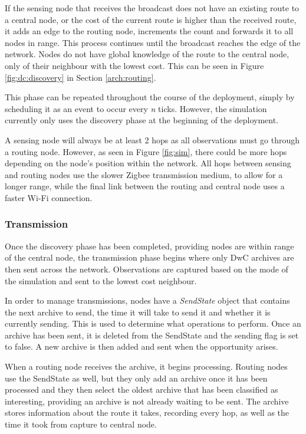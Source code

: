 	If the sensing node that receives the broadcast does not have an existing route to a central node, or the cost of the current route is higher than the received route, it adds an edge to the routing node, increments the count and forwards it to all nodes in range. This process continues until the broadcast reaches the edge of the network. Nodes do not have global knowledge of the route to the central node, only of their neighbour with the lowest cost. This can be seen in Figure \ref{fig:dc:discovery} in Section \ref{arch:routing}.
	
	This phase can be repeated throughout the course of the deployment, simply by scheduling it as an event to occur every \textit{n} ticks. However, the simulation currently only uses the discovery phase at the beginning of the deployment.

	A sensing node will always be at least 2 hops as all observations must go through a routing node. However, as seen in Figure \ref{fig:sim}, there could be more hops depending on the node's position within the network. All hops between sensing and routing nodes use the slower Zigbee transmission medium, to allow for a longer range, while the final link between the routing and central node uses a faster Wi-Fi connection.
	
\subsubsection{Transmission}
	Once the discovery phase has been completed, providing nodes are within range of the central node, the transmission phase begins where only DwC archives are then sent across the network. Observations are captured based on the mode of the simulation and sent to the lowest cost neighbour.
	
	In order to manage transmissions, nodes have a \textit{SendState} object that contains the next archive to send, the time it will take to send it and whether it is currently sending. This is used to determine what operations to perform. Once an archive has been sent, it is deleted from the SendState and the sending flag is set to false. A new archive is then added and sent when the opportunity arises.
	
	When a routing node receives the archive, it begins processing. Routing nodes use the SendState as well, but they only add an archive once it has been processed and they then select the oldest archive that has been classified as interesting, providing an archive is not already waiting to be sent. The archive stores information about the route it takes, recording every hop, as well as the time it took from capture to central node.
	
